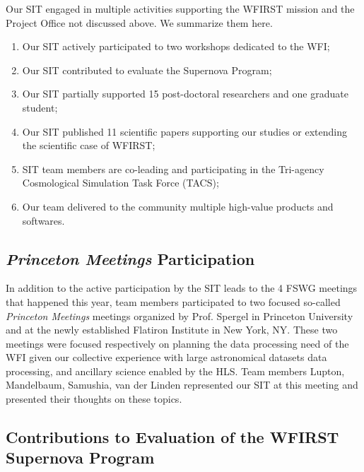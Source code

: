 

\begin{summary}
Our SIT engaged in multiple activities supporting the WFIRST mission and the Project Office not discussed above. We summarize them here.
\begin{enumerate}
\item Our SIT actively participated to two workshops dedicated to the WFI;
\item Our SIT contributed to evaluate the Supernova Program;
\item Our SIT partially supported 15 post-doctoral researchers and one graduate student;
\item Our SIT published 11 scientific papers supporting our studies or extending the scientific case of WFIRST;
\item SIT team members are co-leading and participating in the Tri-agency Cosmological Simulation Task Force (TACS);
\item Our team delivered to the community multiple high-value products and softwares.
\end{enumerate}
\end{summary}


\subsection{\emph{Princeton Meetings} Participation}

In addition to the active participation by the SIT leads to the 4 FSWG meetings that happened this year, team members participated to two focused so-called \emph{Princeton Meetings} meetings organized by Prof. Spergel in Princeton University and at the newly established Flatiron Institute in  New York, NY. These two meetings were focused respectively on planning the data processing need of the WFI given our collective experience with large astronomical datasets data processing, and ancillary science enabled by the HLS. Team members Lupton, Mandelbaum, Samushia, van der Linden represented our SIT at this meeting and presented their thoughts on these topics.

\subsection{Contributions to Evaluation of the WFIRST Supernova Program}

